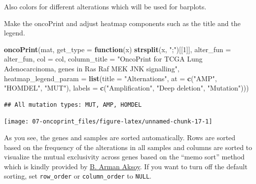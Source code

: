 \documentclass[]{book}
\newenvironment{Shaded}{\begin{snugshade}}{\end{snugshade}}
\newcommand{\KeywordTok}[1]{\textcolor[rgb]{0.13,0.29,0.53}{\textbf{#1}}}
\newcommand{\DataTypeTok}[1]{\textcolor[rgb]{0.13,0.29,0.53}{#1}}
\newcommand{\DecValTok}[1]{\textcolor[rgb]{0.00,0.00,0.81}{#1}}
\newcommand{\StringTok}[1]{\textcolor[rgb]{0.31,0.60,0.02}{#1}}
\newcommand{\ControlFlowTok}[1]{\textcolor[rgb]{0.13,0.29,0.53}{\textbf{#1}}}
\newcommand{\NormalTok}[1]{#1}
\theoremstyle{definition}
\theoremstyle{definition}
\theoremstyle{definition}
\theoremstyle{remark}
\begin{document}
Also colors for different alterations which will be used for barplots.

\begin{Shaded}
\end{Shaded}

Make the oncoPrint and adjust heatmap components such as the title and
the legend.

\begin{Shaded}
\begin{Highlighting}[]
\KeywordTok{oncoPrint}\NormalTok{(mat, }\DataTypeTok{get_type =} \ControlFlowTok{function}\NormalTok{(x) }\KeywordTok{strsplit}\NormalTok{(x, }\StringTok{";"}\NormalTok{)[[}\DecValTok{1}\NormalTok{]],}
    \DataTypeTok{alter_fun =}\NormalTok{ alter_fun, }\DataTypeTok{col =}\NormalTok{ col, }
    \DataTypeTok{column_title =} \StringTok{"OncoPrint for TCGA Lung Adenocarcinoma, genes in Ras Raf MEK JNK signalling"}\NormalTok{,}
    \DataTypeTok{heatmap_legend_param =} \KeywordTok{list}\NormalTok{(}\DataTypeTok{title =} \StringTok{"Alternations"}\NormalTok{, }\DataTypeTok{at =} \KeywordTok{c}\NormalTok{(}\StringTok{"AMP"}\NormalTok{, }\StringTok{"HOMDEL"}\NormalTok{, }\StringTok{"MUT"}\NormalTok{), }
        \DataTypeTok{labels =} \KeywordTok{c}\NormalTok{(}\StringTok{"Amplification"}\NormalTok{, }\StringTok{"Deep deletion"}\NormalTok{, }\StringTok{"Mutation"}\NormalTok{)))}
\end{Highlighting}
\end{Shaded}

\begin{verbatim}
## All mutation types: MUT, AMP, HOMDEL
\end{verbatim}

\begin{center}\texttt{[image: 07-oncoprint\_files/figure-latex/unnamed-chunk-17-1]} \end{center}

As you see, the genes and samples are sorted automatically. Rows are
sorted based on the frequency of the alterations in all samples and
columns are sorted to visualize the mutual exclusivity across genes
based on the ``memo sort'' method which is kindly provided by
\href{https://gist.github.com/armish/564a65ab874a770e2c26}{B. Arman
Aksoy}. If you want to turn off the default sorting, set
\texttt{row\_order} or \texttt{column\_order} to \texttt{NULL}.
\end{document}
